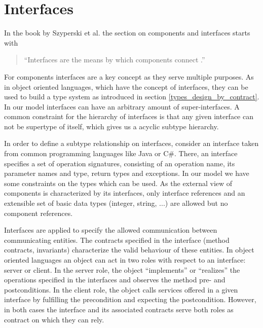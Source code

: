 %
%
%
%
%

\section{Interfaces} %

In the book by Szyperski et al. the section on components and interfaces starts with

\begin{quote}
"`Interfaces are the means by which components connect \cite[p. 50]{szyperski2002a}."'
\end{quote}

For components interfaces are a key concept as they serve multiple purposes. As in object oriented languages, which have the concept of interfaces, they can be used to build a type system as introduced in section \ref{types_design_by_contract}. In our model interfaces can have an arbitrary amount of super-interfaces. A common constraint for the hierarchy of interfaces is that any given interface can not be supertype of itself, which gives us a acyclic subtype hierarchy.

In order to define a subtype relationship on interfaces, consider an interface taken from common programming languages like Java or C\#. There, an interface specifies a set of operation signatures, consisting of an operation name, its parameter names and type, return types and exceptions. In our model we have some constraints on the types which can be used. As the external view of components is characterized by its interfaces, only interface references and an extensible set of basic data types (integer, string, ...) are allowed but no component references.

Interfaces are applied to specify the allowed communication between communicating entities. The contracts specified in the interface (method contracts, invariants) characterize the valid behaviour of these entities. In object oriented languages an object can act in two roles with respect to an interface: server or client. In the server role, the object "`implements"' or "`realizes"' the operations specified in the interfaces and observes the method pre- and postconditions. In the client role, the object calls services offered in a given interface by fulfilling the precondition and expecting the postcondition. However, in both cases the interface and its associated contracts serve both roles as contract on which they can rely.
 
